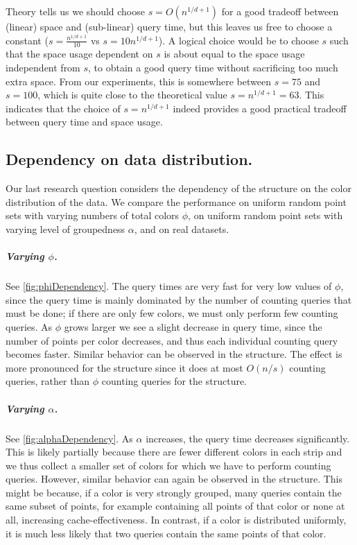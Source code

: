 \documentclass[twoside,leqno,twocolumn]{article}
\begin{document}
Theory tells us we should choose $s = O(n^{1/{d+1}})$ for a good
tradeoff between (linear) space and (sub-linear) query time, but this
leaves us free to choose a constant ($s = \frac{n^{1/{d+1}}}{10}$ vs
$s = 10 n^{1/{d+1}}$). A logical choice would be to choose $s$ such
that the space usage dependent on $s$ is about equal to the space
usage independent from $s$, to obtain a good query time without sacrificing too much extra space. From our experiments, this is somewhere between $s = 75$ and $s = 100$, which is
quite close to the theoretical value $s = n^{1/{d+1}} = 63$. This indicates that the choice of $s = n^{1/{d+1}}$ indeed provides a good practical tradeoff between query time and space usage.




\subsection{Dependency on data distribution.}
Our last research question considers the dependency of the \grid structure on the color distribution of the data. We compare the performance on uniform random point sets with varying numbers of total colors $\phi$, on uniform random point sets with varying level of groupedness $\alpha$, and on real datasets.


\subparagraph{Varying $\phi$.} See \cref{fig:phiDependency}. The query times are very fast for very low values of $\phi$, since the query time is mainly dominated by the number of counting queries that must be done; if there are only few colors, we must only perform few counting queries. As $\phi$ grows larger we see a slight decrease in query time, since the number of points per color decreases, and thus each individual counting query becomes faster. Similar behavior can be observed in the \rangeTrees structure. The effect is more pronounced for the \grid structure since it does at most $O(n/s)$ counting queries, rather than $\phi$ counting queries for the \rangeTrees structure.

\subparagraph{Varying $\alpha$.} See \cref{fig:alphaDependency}. As $\alpha$ increases, the query time decreases significantly. This is likely partially because there are fewer different colors in each strip and we thus collect a smaller set of colors for which we have to perform counting queries. However, similar behavior can again be observed in the \rangeTrees structure. This might be because, if a color is very strongly grouped, many queries contain the same subset of points, for example containing all points of that color or none at all, increasing cache-effectiveness. In contrast, if a color is distributed uniformly, it is much less likely that two queries contain the same points of that color.
\end{document}
